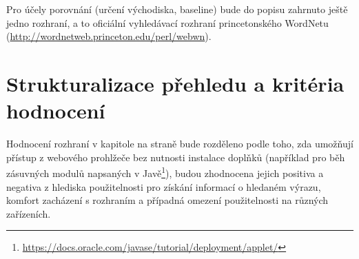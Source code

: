 \documentclass[a4paper, 11pt, oneside]{book}
\newcommand{\itNameRef}[1]{\textit{\nameref{#1}}}
\begin{document}

				Pro účely porovnání (určení východiska, baseline) bude do popisu zahrnuto ještě jedno rozhraní, a to oficiální vyhledávací rozhraní princetonského WordNetu (\url{http://wordnetweb.princeton.edu/perl/webwn}). 

			\section{Strukturalizace přehledu a kritéria hodnocení}
			\label{cha:structhodnoc}

				Hodnocení rozhraní v kapitole \itNameRef{cha:porovnani} na straně \pageref{cha:porovnani} bude rozděleno podle toho, zda umožňují přístup z webového prohlžeče bez nutnosti instalace doplňků (například pro běh zásuvných modulů napsaných v Javě\footnote{\url{https://docs.oracle.com/javase/tutorial/deployment/applet/}}), budou zhodnocena jejich positiva a negativa z hlediska použitelnosti pro získání informací o hledaném výrazu, komfort zacházení s rozhraním a případná omezení použitelnosti na různých zařízeních. 
\end{document}
